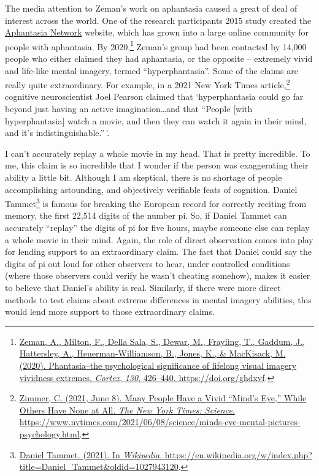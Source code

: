 \documentclass[
  oneside,
  12pt]{crumpbook}
\begin{document}
The media attention to Zeman's work on aphantasia caused a great of deal of interest across the world. One of the research participants 2015 study created the \href{https://aphantasia.com}{Aphantasia Network} website, which has grown into a large online community for people with aphantasia. By 2020,\footnote{\protect\hyperlink{ref-zemanPhantasiaPsychologicalSignificance2020}{Zeman, A., Milton, F., Della Sala, S., Dewar, M., Frayling, T., Gaddum, J., Hattersley, A., Heuerman-Williamson, B., Jones, K., \& MacKisack, M. (2020). Phantasia--the psychological significance of lifelong visual imagery vividness extremes. \emph{Cortex}, \emph{130}, 426--440. \url{https://doi.org/ghdxvf}}.} Zeman's group had been contacted by 14,000 people who either claimed they had aphantasia, or the opposite -- extremely vivid and life-like mental imagery, termed ``hyperphantasia''. Some of the claims are really quite extraordinary. For example, in a 2021 New York Times article,\footnote{\protect\hyperlink{ref-zimmerManyPeopleHave2021}{Zimmer, C. (2021, June 8). Many {People Have} a {Vivid} {``{Mind}'s {Eye},''} {While Others Have None} at {All}. \emph{The New York Times: Science}. \url{https://www.nytimes.com/2021/06/08/science/minds-eye-mental-pictures-psychology.html}}.} cognitive neuroscientist Joel Pearson claimed that `hyperphantasia could go far beyond just having an active imagination\ldots and that ``People {[}with hyperphantasia{]} watch a movie, and then they can watch it again in their mind, and it's indistinguishable.''\,'.

I can't accurately replay a whole movie in my head. That is pretty incredible. To me, this claim is so incredible that I wonder if the person was exaggerating their ability a little bit. Although I am skeptical, there is no shortage of people accomplishing astounding, and objectively verifiable feats of cognition. Daniel Tammet\footnote{\protect\hyperlink{ref-DanielTammet2021}{Daniel {Tammet}. (2021). In \emph{Wikipedia}. \url{https://en.wikipedia.org/w/index.php?title=Daniel_Tammet\&oldid=1027943120}}.} is famous for breaking the European record for correctly reciting from memory, the first 22,514 digits of the number pi. So, if Daniel Tammet can accurately ``replay'' the digits of pi for five hours, maybe someone else can replay a whole movie in their mind. Again, the role of direct observation comes into play for lending support to an extraordinary claim. The fact that Daniel could say the digits of pi out loud for other observers to hear, under controlled conditions (where those observers could verify he wasn't cheating somehow), makes it easier to believe that Daniel's ability is real. Similarly, if there were more direct methods to test claims about extreme differences in mental imagery abilities, this would lend more support to those extraordinary claims.
\end{document}
